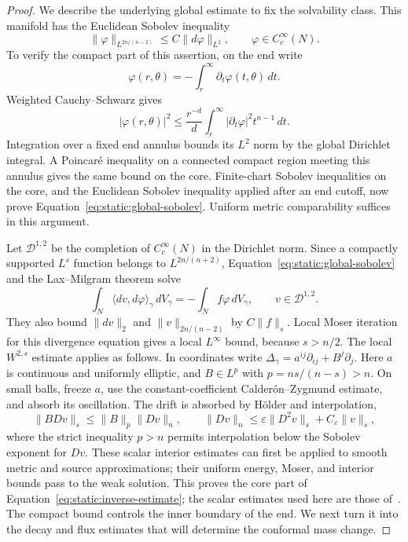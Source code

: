 \begin{proof}
We describe the underlying global estimate to fix the solvability
class.  This manifold has the Euclidean Sobolev inequality
\begin{equation}
 \|\varphi\|_{L^{2n/(n-2)}}
       \le C\|d\varphi\|_{L^2},\qquad
       \varphi\in C_c^\infty(N).
 \label{eq:static:global-sobolev}
\end{equation}
To verify the compact part of this assertion, on the end write
\[
 \varphi(r,\theta)=-\int_r^\infty\partial_t\varphi(t,\theta)\,dt.
\]
Weighted Cauchy--Schwarz gives
\[
 |\varphi(r,\theta)|^2
 \le\frac{r^{-d}}d
       \int_r^\infty|\partial_t\varphi|^2t^{n-1}\,dt.
\]
Integration over a fixed end annulus bounds its $L^2$ norm by the
global Dirichlet integral.  A Poincar\'e inequality on a connected
compact region meeting this annulus gives the same bound on the
core.  Finite-chart Sobolev inequalities on the core, and the
Euclidean Sobolev inequality applied after an end cutoff, now prove
Equation~\eqref{eq:static:global-sobolev}.  Uniform metric
comparability suffices in this argument.

Let $\mathcal D^{1,2}$ be the completion of $C_c^\infty(N)$ in the
Dirichlet norm.  Since a compactly supported $L^s$ function belongs
to $L^{2n/(n+2)}$, Equation~\eqref{eq:static:global-sobolev} and the
Lax--Milgram theorem solve
\[
 \int_N\langle dv,d\varphi\rangle_\gamma\,dV_\gamma
       =-\int_N f\varphi\,dV_\gamma,
 \qquad v\in\mathcal D^{1,2}.
\]
They also bound $\|dv\|_2$ and $\|v\|_{2n/(n-2)}$ by $C\|f\|_s$.
Local Moser iteration for this divergence equation gives a local
$L^\infty$ bound, because $s>n/2$.  The local $W^{2,s}$ estimate
applies as follows.  In coordinates write
$\Delta_\gamma=a^{ij}\partial_{ij}+B^j\partial_j$.
Here $a$ is continuous and uniformly elliptic, and
$B\in L^p$ with $p=ns/(n-s)>n$.  On small balls, freeze $a$, use the
constant-coefficient Calder\'on--Zygmund estimate, and absorb its
oscillation.  The drift is absorbed by H\"older and interpolation,
\[
 \|B Dv\|_s\le\|B\|_p\|Dv\|_n,
 \qquad
 \|Dv\|_n\le\varepsilon\|D^2v\|_s+C_\varepsilon\|v\|_s,
\]
where the strict inequality $p>n$ permits interpolation below the
Sobolev exponent for $Dv$.  These scalar interior estimates can
first be applied to smooth metric and source approximations; their
uniform energy, Moser, and interior bounds pass to the weak solution.
This proves the core part of
Equation~\eqref{eq:static:inverse-estimate}; the scalar estimates used
here are those of~\cite{GilbargTrudinger2001}.  The compact bound controls
the inner boundary of the end.  We next turn it into the decay and
flux estimates that will determine the conformal mass change.


\end{proof}
